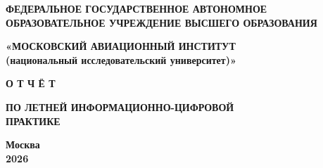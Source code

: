 \begin{titlepage}
\begin{center}
\thispagestyle{empty}

\small
\textbf{ФЕДЕРАЛЬНОЕ ГОСУДАРСТВЕННОЕ АВТОНОМНОЕ ОБРАЗОВАТЕЛЬНОЕ УЧРЕЖДЕНИЕ ВЫСШЕГО ОБРАЗОВАНИЯ} \par
\vspace{0.3cm}
\textbf{«МОСКОВСКИЙ АВИАЦИОННЫЙ ИНСТИТУТ \\ (национальный исследовательский университет)»} \par

\vspace{6cm}

{\Huge \textbf{О Т Ч Ё Т} \par}
\vspace{1.5cm}
{\LARGE \textbf{ПО ЛЕТНЕЙ ИНФОРМАЦИОННО-ЦИФРОВОЙ \\ ПРАКТИКЕ} \par}

\vfill

{\Large \textbf{Москва \\ 2026} \par}

\end{center}
\end{titlepage}
